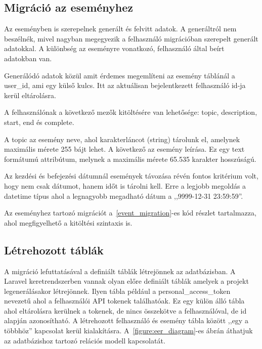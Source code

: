 \documentclass[
]{thesis-ekf}
\theoremstyle{definition}
\theoremstyle{remark}
\begin{document}
	
	
	\subsection{Migráció az eseményhez}
	Az eseményben is szerepelnek generált és felvitt adatok. A generáltról nem beszélnék, mivel nagyban megegyezik a felhasználó migrációban szerepelt generált adatokkal. A különbség az eseményre vonatkozó, felhasználó által beírt adatokban van. 
	
	Generálódó adatok közül amit érdemes megemlíteni az esemény táblánál a user\_id, ami egy külső kulcs. Itt az aktuálisan bejelentkezett felhasználó id-ja kerül eltárolásra. 
	
	A felhasználónak a következő mezők kitöltésére van lehetősége: topic, description, start, end és complete. 
	
	A topic az esemény neve, ahol karakterláncot (string) tárolunk el, amelynek maximális mérete 255 bájt lehet. A következő az esemény leírása. Ez egy text formátumú attribútum, melynek a maximális mérete 65.535 karakter hosszúságú.
	
	Az kezdési és befejezési dátumnál események távozása révén fontos kritérium volt, hogy nem csak dátumot, hanem időt is tárolni kell. Erre a legjobb megoldás a datetime típus ahol a legnagyobb megadható dátum a ,,9999-12-31 23:59:59''.
	
	Az eseményhez tartozó migrációt a~\ref{event_migration}-es kód részlet tartalmazza, ahol megfigyelhető a kitöltési szintaxis is. 
	
	
	
	\subsection{Létrehozott táblák}
	A migráció lefuttatásával a definiált táblák létrejönnek az adatbázisban. A Laravel keretrendszerben vannak olyan előre definiált táblák amelyek a projekt legenerálásakor létrejönnek. Ilyen tábla például a personal\_access\_token nevezetű ahol a felhasználói API tokenek találhatóak. Ez egy külön álló tábla ahol eltárolásra kerülnek a tokenek, de nincs összekötve a felhasználóval, de id alapján azonosítható. A létrehozott felhasználó és esemény tábla között ,,egy a többhöz'' kapcsolat kerül kialakításra. A~\ref{figure:eer_diagram}-es ábrán áthatjuk az adatbázishoz tartozó relációs modell kapcsolatát.
	
\end{document}
